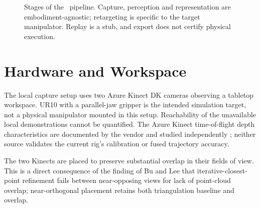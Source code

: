 \begin{figure}[htbp]
\centering
{}
\caption{Stages of the \viki\ pipeline. Capture, perception and representation
are embodiment-agnostic; retargeting is specific to the target manipulator.
Replay is a stub, and export does not certify physical execution.}
\label{fig:pipeline}
\end{figure}

\section{Hardware and Workspace}
\label{sec:hardware}

The local capture setup uses two Azure Kinect DK cameras observing a
tabletop workspace. UR10 with a parallel-jaw gripper is the intended
simulation target, not a physical manipulator mounted in this setup.
Reachability of the unavailable local demonstrations cannot be quantified.
The Azure Kinect time-of-flight depth characteristics are documented by the
vendor \cite{mskinect} and studied independently \cite{tolgyessy}; neither
source validates the current rig's calibration or fused trajectory accuracy.

The two Kinects are placed to preserve substantial overlap in their fields of
view. This is a direct consequence of the finding of Bu and Lee \cite{bulee}
that iterative-closest-point refinement fails between near-opposing views for
lack of point-cloud overlap; near-orthogonal placement retains both
triangulation baseline and overlap.

